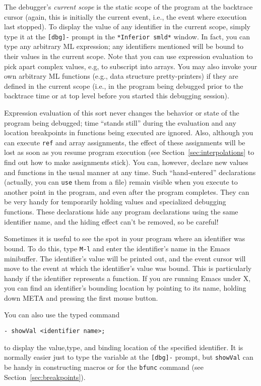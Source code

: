 The debugger's {\em current scope} is the static scope of the program
at the backtrace cursor (again, this is initially the current event, i.e.,
the event where execution last stopped).
To display the value of any identifier in the current scope, simply type it
at the \verb'[dbg]-'
prompt in the \verb'*Inferior smld*' window.  In fact, you can type
any arbitrary ML expression; any identifiers mentioned will be bound to
their values in the current scope.  Note that you can use expression 
evaluation to pick apart complex values, e.g, to subscript into arrays.
You may also invoke your own arbitrary ML functions (e.g., data structure
pretty-printers) if they are defined in the current scope (i.e., in the
program being debugged prior to the backtrace time or at top level before
you started this debugging session).

Expression evaluation of this sort never changes the behavior or state
of the program being debugged; time ``stands still'' during the evaluation
and any location breakpoints in functions being executed are ignored.
Also, although you can execute {\tt ref} and array assignments, the effect of
these assignments will be lost as soon as you resume program execution
(see Section~\ref{sec:interpolations} to find out how to make assignments stick).
You can, however, declare new values and functions in the usual manner at
any time.
Such ``hand-entered'' declarations (actually, you can \verb'use' them from
a file) remain visible when you 
execute to another point in the program, and even after the program completes.
They can be very handy for temporarily holding values and specialized
debugging functions.
These declarations hide any program declarations 
using the same identifier name, and the hiding effect can't be removed,
so be careful!

Sometimes it is useful to see the spot in your program where an identifier
was bound.  To do this, type \verb'M-l' and enter the identifier's name
in the Emacs minibuffer.  The identifier's value will be printed out, and
the event cursor will
move to the event at which the identifier's value was bound.  This is 
particularly handy if the identifier represents a function. 
If you are running Emacs under X, you can find an identifier's bounding
location by pointing to its name, holding down META and pressing 
the first mouse button.

You can also use the typed command
\begin{verbatim}
- showVal <identifier name>;
\end{verbatim}
to display the value,type, and binding location of the specified identifier.
It is normally easier just to type the variable at the \verb'[dbg]-' prompt,
but \verb'showVal' can be handy in constructing macros or for the 
\verb'bfunc' command (see Section~\ref{sec:breakpoints}).

